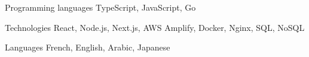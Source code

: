 

\begin{cvskills}

  \cvskill
    {Programming languages} %
    {TypeScript, JavaScript, Go} %

  \cvskill
    {Technologies} %
    {React, Node.js, Next.js, AWS Amplify, Docker, Nginx, SQL, NoSQL}  %

  \cvskill
    {Languages} %
    {French, English, Arabic, Japanese} %

\end{cvskills}

